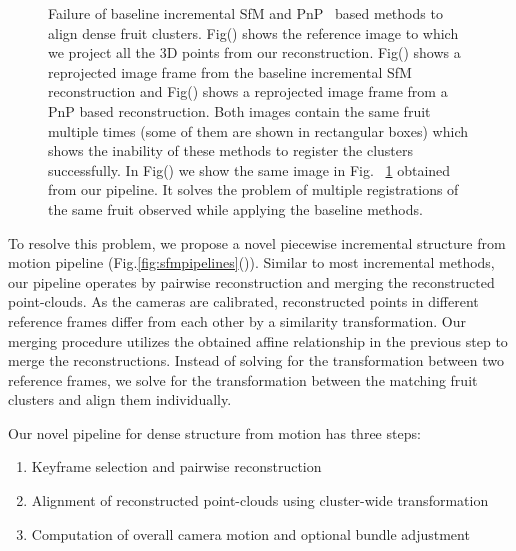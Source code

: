 \begin{figure}[!htbp]
        \caption[Failure of baseline incremental structure from motion (SfM) and PnP~\cite{pnp} based methods to align dense fruit clusters.]{Failure of baseline incremental SfM and PnP~\cite{pnp} based methods to align dense fruit clusters. Fig() shows the reference image to which we project all the 3D points from our reconstruction. Fig() shows a reprojected image frame from the baseline incremental SfM reconstruction and Fig() shows a reprojected image frame from a PnP based reconstruction. Both images contain the same fruit multiple times (some of them are shown in rectangular boxes) which shows the inability of these methods to register the clusters successfully. In Fig() we show the same image in Fig. ~\ref{fig:pnpbase} obtained from our pipeline. It solves the problem of multiple registrations of the same fruit observed while applying the baseline methods.}
 \label{fig:pnpbase}
\end{figure}

To resolve this problem, we propose a novel piecewise incremental structure from motion pipeline (Fig.\ref{fig:sfmpipelines}()). Similar to most incremental methods, our pipeline operates by pairwise reconstruction and merging the reconstructed point-clouds. As the cameras are calibrated, reconstructed points in different reference frames differ from each other by a similarity transformation. Our merging procedure utilizes the obtained affine relationship in the previous step to merge the reconstructions. Instead of solving for the transformation between two reference frames, we solve for the transformation between the matching fruit clusters and align them individually.


Our novel pipeline for dense structure from motion has three steps:
\begin{enumerate}
\item Keyframe selection and pairwise reconstruction
\item Alignment of reconstructed point-clouds using cluster-wide  transformation 
\item Computation of  overall camera motion and optional bundle adjustment
\end{enumerate}







